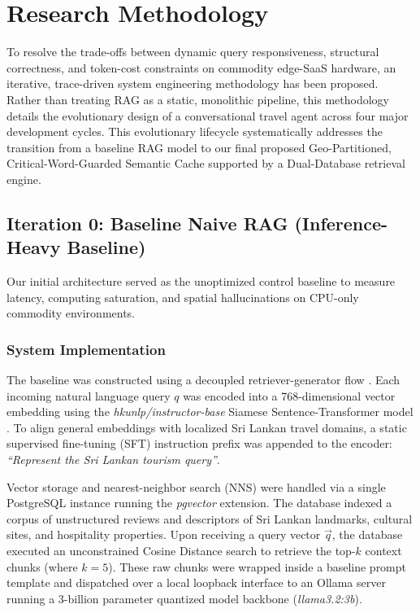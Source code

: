 \documentclass{ieeeaccess}
\begin{document}
\section{Research Methodology}
To resolve the trade-offs between dynamic query responsiveness, structural correctness, and token-cost constraints on commodity edge-SaaS hardware, an iterative, trace-driven system engineering methodology has been proposed. Rather than treating RAG as a static, monolithic pipeline, this methodology details the evolutionary design of a conversational travel agent across four major development cycles. This evolutionary lifecycle systematically addresses the transition from a baseline RAG model to our final proposed Geo-Partitioned, Critical-Word-Guarded Semantic Cache supported by a Dual-Database retrieval engine.

\subsection{Iteration 0: Baseline Naive RAG (Inference-Heavy Baseline)}
Our initial architecture served as the unoptimized control baseline to measure latency, computing saturation, and spatial hallucinations on CPU-only commodity environments.

\subsubsection{System Implementation}
The baseline was constructed using a decoupled retriever-generator flow \cite{lewis-rag-2020}. Each incoming natural language query $q$ was encoded into a 768-dimensional vector embedding using the \emph{hkunlp/instructor-base} Siamese Sentence-Transformer model \cite{reimers-sbert-2019}. To align general embeddings with localized Sri Lankan travel domains, a static supervised fine-tuning (SFT) instruction prefix was appended to the encoder: \emph{``Represent the Sri Lankan tourism query''}.

Vector storage and nearest-neighbor search (NNS) were handled via a single PostgreSQL instance running the \emph{pgvector} extension. The database indexed a corpus of unstructured reviews and descriptors of Sri Lankan landmarks, cultural sites, and hospitality properties. Upon receiving a query vector $\vec{q}$, the database executed an unconstrained Cosine Distance search to retrieve the top-$k$ context chunks (where $k=5$). These raw chunks were wrapped inside a baseline prompt template and dispatched over a local loopback interface to an Ollama server running a 3-billion parameter quantized model backbone (\emph{llama3.2:3b}).
\end{document}
